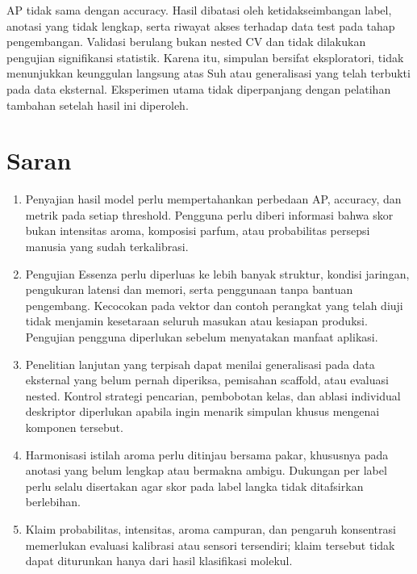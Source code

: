 AP tidak sama dengan accuracy. Hasil dibatasi oleh ketidakseimbangan label, anotasi yang tidak lengkap, serta riwayat akses terhadap data test pada tahap pengembangan. Validasi berulang bukan nested CV dan tidak dilakukan pengujian signifikansi statistik. Karena itu, simpulan bersifat eksploratori, tidak menunjukkan keunggulan langsung atas Suh atau generalisasi yang telah terbukti pada data eksternal. Eksperimen utama tidak diperpanjang dengan pelatihan tambahan setelah hasil ini diperoleh.

\section{Saran}
\begin{enumerate}
    \item Penyajian hasil model perlu mempertahankan perbedaan AP, accuracy, dan metrik pada setiap threshold. Pengguna perlu diberi informasi bahwa skor bukan intensitas aroma, komposisi parfum, atau probabilitas persepsi manusia yang sudah terkalibrasi.
    \item Pengujian Essenza perlu diperluas ke lebih banyak struktur, kondisi jaringan, pengukuran latensi dan memori, serta penggunaan tanpa bantuan pengembang. Kecocokan pada vektor dan contoh perangkat yang telah diuji tidak menjamin kesetaraan seluruh masukan atau kesiapan produksi. Pengujian pengguna diperlukan sebelum menyatakan manfaat aplikasi.
    \item Penelitian lanjutan yang terpisah dapat menilai generalisasi pada data eksternal yang belum pernah diperiksa, pemisahan scaffold, atau evaluasi nested. Kontrol strategi pencarian, pembobotan kelas, dan ablasi individual deskriptor diperlukan apabila ingin menarik simpulan khusus mengenai komponen tersebut.
    \item Harmonisasi istilah aroma perlu ditinjau bersama pakar, khususnya pada anotasi yang belum lengkap atau bermakna ambigu. Dukungan per label perlu selalu disertakan agar skor pada label langka tidak ditafsirkan berlebihan.
    \item Klaim probabilitas, intensitas, aroma campuran, dan pengaruh konsentrasi memerlukan evaluasi kalibrasi atau sensori tersendiri; klaim tersebut tidak dapat diturunkan hanya dari hasil klasifikasi molekul.
\end{enumerate}
